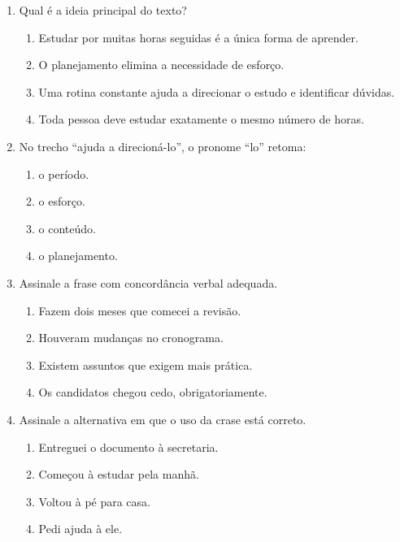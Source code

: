 \documentclass[12pt,a4paper]{article}
\begin{document}
\begin{enumerate}
  \item Qual é a ideia principal do texto?
  \begin{enumerate}[label=\alph*)]
    \item Estudar por muitas horas seguidas é a única forma de aprender.
    \item O planejamento elimina a necessidade de esforço.
    \item Uma rotina constante ajuda a direcionar o estudo e identificar dúvidas.
    \item Toda pessoa deve estudar exatamente o mesmo número de horas.
  \end{enumerate}

  \item No trecho ``ajuda a direcioná-lo'', o pronome ``lo'' retoma:
  \begin{enumerate}[label=\alph*)]
    \item o período.
    \item o esforço.
    \item o conteúdo.
    \item o planejamento.
  \end{enumerate}

  \item Assinale a frase com concordância verbal adequada.
  \begin{enumerate}[label=\alph*)]
    \item Fazem dois meses que comecei a revisão.
    \item Houveram mudanças no cronograma.
    \item Existem assuntos que exigem mais prática.
    \item Os candidatos chegou cedo, obrigatoriamente.
  \end{enumerate}

  \item Assinale a alternativa em que o uso da crase está correto.
  \begin{enumerate}[label=\alph*)]
    \item Entreguei o documento à secretaria.
    \item Começou à estudar pela manhã.
    \item Voltou à pé para casa.
    \item Pedi ajuda à ele.
  \end{enumerate}
\end{enumerate}
\end{document}
